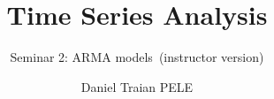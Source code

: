\title[Time Series Analysis]{Time Series Analysis}
\subtitle{Seminar 2: ARMA models\ifsolutions\ (instructor version)\fi}
\author[D.T. Pele]{Daniel Traian PELE}
\date{}

\providecommand{\tsaapplink}[3]{\hypertarget{#2}{}\hyperlink{#1}{\beamergotobutton{#3}}}  %
\providecommand{\tsaappback}[2]{\begin{tikzpicture}[remember picture,overlay]\node[anchor=south east] at ([xshift=-3mm,yshift=7mm]current page.south east){\hyperlink{#1}{\beamerreturnbutton{#2}}};\end{tikzpicture}}  %
\providecommand{\tsachlink}[2]{\href{#1}{#2}}  %
\providecommand{\tsachlinkt}[2]{\href{#1}{\usebeamercolor[fg]{frametitle}#2}}  %


